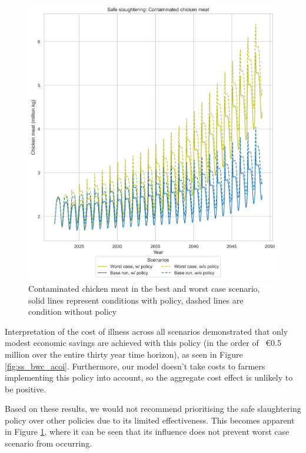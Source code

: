 \begin{figure}[h!]
\begin{minipage}{0.45\textwidth}
        \includegraphics[width=1\textwidth]{images/ss_Base and Worst Case_meat.png} 
        \caption{Contaminated chicken meat in the best and worst case scenario, solid lines represent conditions with policy, dashed lines are condition without policy}
        \label{fig:ss_bwc_meat}
    \end{minipage}
\end{figure}

Interpretation of the cost of illness across all scenarios demonstrated that only modest economic savings are achieved with this policy (in the order of ~€0.5 million over the entire thirty year time horizon), as seen in Figure \ref{fig:ss_bwc_acoi}. Furthermore, our model doesn't take costs to farmers implementing this policy into account, so the aggregate cost effect is unlikely to be positive.

Based on these results, we would not recommend prioritising the safe slaughtering policy over other policies due to its limited effectiveness. This becomes apparent in Figure \ref{fig:ss_bwc_meat}, where
it can be seen that its influence does not prevent worst case scenario from occurring. 

